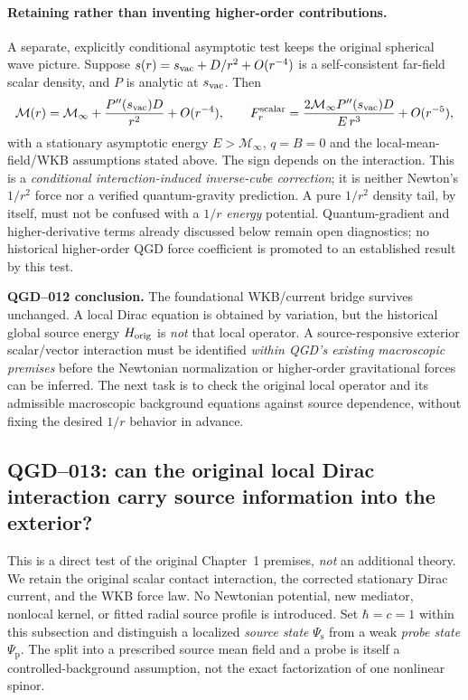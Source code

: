 \documentclass[11pt,a4paper]{article}
\begin{document}
\paragraph{Retaining rather than inventing higher-order contributions.}
A separate, explicitly conditional asymptotic test keeps the original spherical wave picture. Suppose $s(r)=s_{\rm vac}+D/r^2+O(r^{-4})$ is a self-consistent far-field scalar density, and $P$ is analytic at $s_{\rm vac}$. Then
\begin{equation}\label{eq:qgd012-asymptotic}
 \mathcal M(r)=\mathcal M_\infty+\frac{P''(s_{\rm vac})D}{r^2}+O(r^{-4}),
 \qquad F_r^{\rm scalar}=\frac{2\mathcal M_\infty P''(s_{\rm vac})D}{E\,r^3}+O(r^{-5}),
\end{equation}
with a stationary asymptotic energy $E>\mathcal M_\infty$, $q=B=0$ and the local-mean-field/WKB assumptions stated above. The sign depends on the interaction. This is a \emph{conditional interaction-induced inverse-cube correction}; it is neither Newton's $1/r^2$ force nor a verified quantum-gravity prediction. A pure $1/r^2$ density tail, by itself, must not be confused with a $1/r$ \emph{energy} potential. Quantum-gradient and higher-derivative terms already discussed below remain open diagnostics; no historical higher-order QGD force coefficient is promoted to an established result by this test.

\noindent\textbf{QGD--012 conclusion.} The foundational WKB/current bridge survives unchanged. A local Dirac equation is obtained by variation, but the historical global source energy $H_{\rm orig}$ is \emph{not} that local operator. A source-responsive exterior scalar/vector interaction must be identified \emph{within QGD's existing macroscopic premises} before the Newtonian normalization or higher-order gravitational forces can be inferred. The next task is to check the original local operator and its admissible macroscopic background equations against source dependence, without fixing the desired $1/r$ behavior in advance.


\subsection{QGD--013: can the original local Dirac interaction carry source information into the exterior?}\label{sec:qgd013-exterior}
This is a direct test of the original Chapter~1 premises, \emph{not} an additional theory. We retain the original scalar contact interaction, the corrected stationary Dirac current, and the WKB force law. No Newtonian potential, new mediator, nonlocal kernel, or fitted radial source profile is introduced. Set $\hbar=c=1$ within this subsection and distinguish a localized \emph{source state} $\Psi_{\mathrm s}$ from a weak \emph{probe state} $\Psi_{\mathrm p}$. The split into a prescribed source mean field and a probe is itself a controlled-background assumption, not the exact factorization of one nonlinear spinor.
\end{document}
